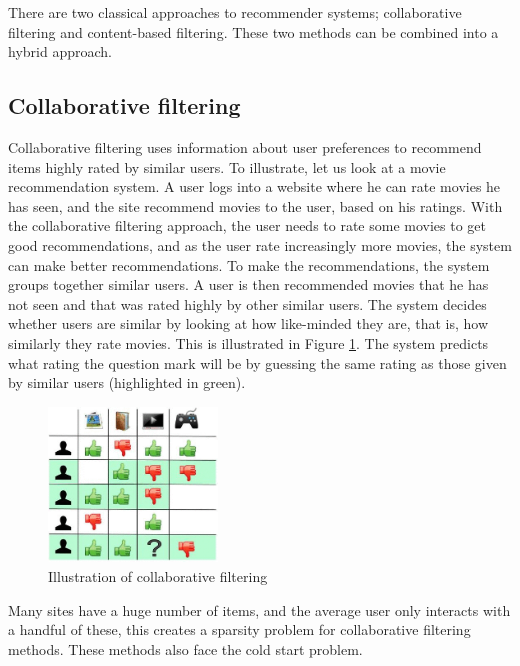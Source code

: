 There are two classical approaches to recommender systems; collaborative filtering and content-based filtering. These two methods can be combined into a hybrid approach.

\subsection{Collaborative filtering}
Collaborative filtering uses information about user preferences to recommend items highly rated by similar users. To illustrate, let us look at a movie recommendation system. A user logs into a website where he can rate movies he has seen, and the site recommend movies to the user, based on his ratings. With the collaborative filtering approach, the user needs to rate some movies to get good recommendations, and as the user rate increasingly more movies, the system can make better recommendations. To make the recommendations, the system groups together similar users. A user is then recommended movies that he has not seen and that was rated highly by other similar users. The system decides whether users are similar by looking at how like-minded they are, that is, how similarly they rate movies. This is illustrated in Figure \ref{fig:collaborative-filtering}. The system predicts what rating the question mark will be by guessing the same rating as those given by similar users (highlighted in green).

\begin{figure}[htp]
	\centering
	\includegraphics[width=0.4\textwidth]{fig/collab-filtering.png}
	\caption{Illustration of collaborative filtering}
	\label{fig:collaborative-filtering}
\end{figure}

Many sites have a huge number of items, and the average user only interacts with a handful of these, this creates a sparsity problem for collaborative filtering methods. These methods also face the cold start problem.

